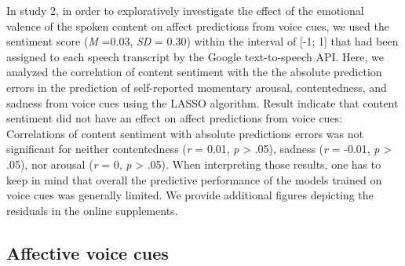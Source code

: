 \documentclass[
  english,
  man,floatsintext]{apa6}
\begin{document}
In study 2, in order to exploratively investigate the effect of the emotional valence of the spoken content on affect predictions from voice cues, we used the sentiment score (\emph{M} =0.03, \emph{SD} = 0.30) within the interval of {[}-1; 1{]} that had been assigned to each speech transcript by the Google text-to-speech API. Here, we analyzed the correlation of content sentiment with the the absolute prediction errors in the prediction of self-reported momentary arousal, contentedness, and sadness from voice cues using the LASSO algorithm. Result indicate that content sentiment did not have an effect on affect predictions from voice cues: Correlations of content sentiment with absolute predictions errors was not significant for neither contentedness (\emph{r} = 0.01, \emph{p} \textgreater{} .05), sadness (\emph{r} = -0.01, \emph{p} \textgreater{} .05), nor arousal (\emph{r} = 0, \emph{p} \textgreater{} .05). When interpreting those results, one has to keep in mind that overall the predictive performance of the models trained on voice cues was generally limited. We provide additional figures depicting the residuals in the online supplements.

\newpage

\hypertarget{affective-voice-cues}{%
\subsection{Affective voice cues}\label{affective-voice-cues}}
\end{document}
